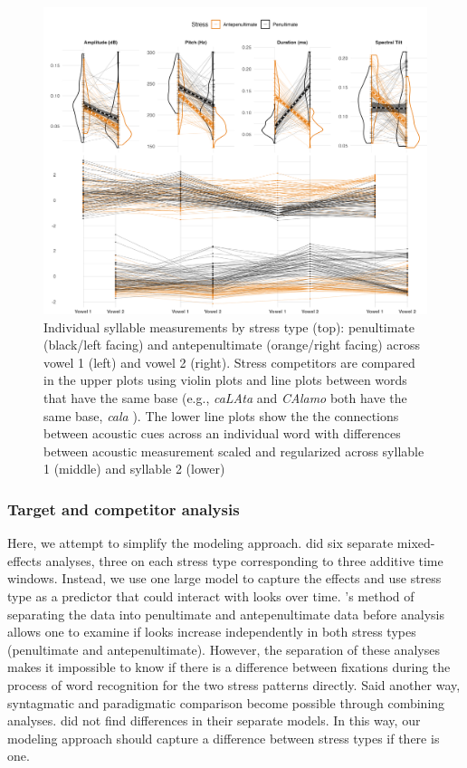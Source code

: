 \begin{figure}[H]
  \centering
  \includegraphics[width=1\linewidth]{visuals/raw_acoustics_combined.jpeg}
  \caption{Individual syllable measurements by stress type (top): penultimate (black/left facing) and antepenultimate (orange/right facing)  across vowel 1 (left) and vowel 2 (right). Stress competitors are compared in the upper plots using violin plots and line plots between words that have the same base (e.g., \textit{caLAta} and \textit{CAlamo} both have the same base, \textit{cala} ). The lower line plots show the the connections between acoustic cues across an individual word with differences between acoustic measurement scaled and regularized across syllable 1 (middle) and syllable 2 (lower)}
  \label{fig:raw_acoustics}
\end{figure}


\subsubsection{Target and competitor analysis}
Here, we attempt to simplify the modeling approach. \cite{Sulpizio_McQueen_2012} did six separate mixed-effects analyses, three on each stress type corresponding to three additive time windows. Instead, we use one large model to capture the effects and use stress type as a predictor that could interact with looks over time. \cite{Sulpizio_McQueen_2012}'s method of separating the data into penultimate and antepenultimate data before analysis allows one to examine if looks increase independently in both stress types (penultimate and antepenultimate). However, the separation of these analyses makes it impossible to know if there is a difference between fixations during the process of word recognition for the two stress patterns directly. Said another way, syntagmatic and paradigmatic comparison become possible through combining analyses. \cite{Sulpizio_McQueen_2012} did not find differences in their separate models. In this way, our modeling approach should capture a difference between stress types if there is one. 

